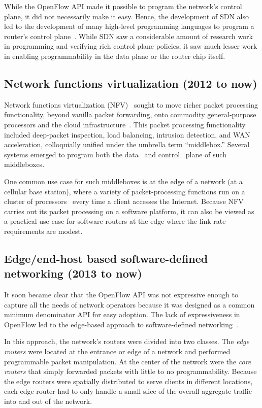 While the OpenFlow API made it possible to program the network's control plane,
it did not necessarily make it easy. Hence, the development of SDN also led to
the development of many high-level programming languages to program a router's
control plane~\cite{frenetic, pyretic}. While SDN saw a considerable amount of
research work in programming and verifying rich control plane policies, it saw
much lesser work in enabling programmability in the data plane or the router
chip itself.

\subsection{Network functions virtualization (2012 to now)}
Network functions virtualization (NFV)~\cite{nfv_etsi_2012} sought to move
richer packet processing functionality, beyond vanilla packet forwarding, onto
commodity general-purpose processors and the cloud
infrastructure~\cite{aplomb}. This packet processing functionality included
deep-packet inspection, load balancing, intrusion detection, and WAN
acceleration, colloquially unified under the umbrella term ``middlebox.''
Several systems emerged to program both the data~\cite{netbricks} and
control~\cite{opennf} plane of such middleboxes.

One common use case for such middleboxes is at the edge of a network (\eg at a
cellular base station), where a variety of packet-processing functions run on a
cluster of processors~\cite{e2} every time a client accesses the Internet.
Because NFV carries out its packet processing on a software platform, it can
also be viewed as a practical use case for software routers at the edge where
the link rate requirements are modest.

\subsection{Edge/end-host based software-defined networking (2013 to now)}
It soon became clear that the OpenFlow API was not expressive enough to capture
all the needs of network operators because it was designed as a common minimum
denominator API for easy adoption. The lack of expressiveness in OpenFlow led
to the edge-based approach to software-defined networking~\cite{fabric_sdn,
nvp, openvswitch}.

In this approach, the network's routers were divided into two classes. The {\em
edge routers} were located at the entrance or edge of a network and performed
programmable packet manipulation. At the center of the network were the {\em
core routers} that simply forwarded packets with little to no programmability.
Because the edge routers were spatially distributed to serve clients in
different locations, each edge router had to only handle a small slice of the
overall aggregate traffic into and out of the network.

